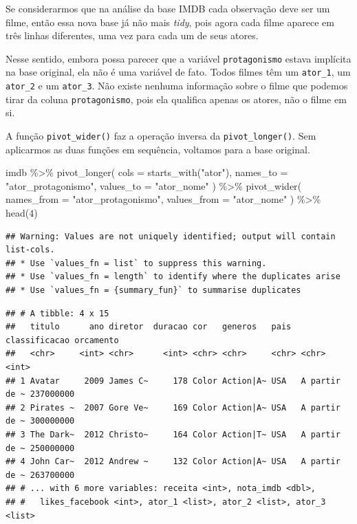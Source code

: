 \documentclass[
]{book}
\newenvironment{Shaded}{\begin{snugshade}}{\end{snugshade}}
\newcommand{\AttributeTok}[1]{\textcolor[rgb]{0.77,0.63,0.00}{#1}}
\newcommand{\DecValTok}[1]{\textcolor[rgb]{0.00,0.00,0.81}{#1}}
\newcommand{\FunctionTok}[1]{\textcolor[rgb]{0.00,0.00,0.00}{#1}}
\newcommand{\NormalTok}[1]{#1}
\newcommand{\SpecialCharTok}[1]{\textcolor[rgb]{0.00,0.00,0.00}{#1}}
\newcommand{\StringTok}[1]{\textcolor[rgb]{0.31,0.60,0.02}{#1}}
\begin{document}
Se considerarmos que na análise da base IMDB cada observação deve ser um filme, então essa nova base já não mais \emph{tidy}, pois agora cada filme aparece em três linhas diferentes, uma vez para cada um de seus atores.

Nesse sentido, embora possa parecer que a variável \texttt{protagonismo} estava implícita na base original, ela não é uma variável de fato. Todos filmes têm um \texttt{ator\_1}, um \texttt{ator\_2} e um \texttt{ator\_3}. Não existe nenhuma informação sobre o filme que podemos tirar da coluna \texttt{protagonismo}, pois ela qualifica apenas os atores, não o filme em si.

A função \texttt{pivot\_wider()} faz a operação inversa da \texttt{pivot\_longer()}. Sem aplicarmos as duas funções em sequência, voltamos para a base original.

\begin{Shaded}
\begin{Highlighting}[]
\NormalTok{imdb }\SpecialCharTok{\%\textgreater{}\%} 
  \FunctionTok{pivot\_longer}\NormalTok{(}
    \AttributeTok{cols =} \FunctionTok{starts\_with}\NormalTok{(}\StringTok{"ator"}\NormalTok{), }
    \AttributeTok{names\_to =} \StringTok{"ator\_protagonismo"}\NormalTok{,}
    \AttributeTok{values\_to =} \StringTok{"ator\_nome"}
\NormalTok{  ) }\SpecialCharTok{\%\textgreater{}\%} 
  \FunctionTok{pivot\_wider}\NormalTok{(}
    \AttributeTok{names\_from =} \StringTok{"ator\_protagonismo"}\NormalTok{,}
    \AttributeTok{values\_from =} \StringTok{"ator\_nome"}
\NormalTok{  ) }\SpecialCharTok{\%\textgreater{}\%} 
  \FunctionTok{head}\NormalTok{(}\DecValTok{4}\NormalTok{)}
\end{Highlighting}
\end{Shaded}

\begin{verbatim}
## Warning: Values are not uniquely identified; output will contain list-cols.
## * Use `values_fn = list` to suppress this warning.
## * Use `values_fn = length` to identify where the duplicates arise
## * Use `values_fn = {summary_fun}` to summarise duplicates
\end{verbatim}

\begin{verbatim}
## # A tibble: 4 x 15
##   titulo      ano diretor  duracao cor   generos   pais  classificacao orcamento
##   <chr>     <int> <chr>      <int> <chr> <chr>     <chr> <chr>             <int>
## 1 Avatar     2009 James C~     178 Color Action|A~ USA   A partir de ~ 237000000
## 2 Pirates ~  2007 Gore Ve~     169 Color Action|A~ USA   A partir de ~ 300000000
## 3 The Dark~  2012 Christo~     164 Color Action|T~ USA   A partir de ~ 250000000
## 4 John Car~  2012 Andrew ~     132 Color Action|A~ USA   A partir de ~ 263700000
## # ... with 6 more variables: receita <int>, nota_imdb <dbl>,
## #   likes_facebook <int>, ator_1 <list>, ator_2 <list>, ator_3 <list>
\end{verbatim}
\end{document}
